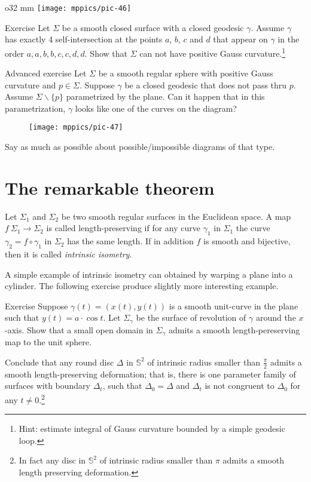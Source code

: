 {

\begin{wrapfigure}{o}{32 mm}
\vskip-0mm
\centering
\texttt{[image: mppics/pic-46]}
\vskip-0mm
\end{wrapfigure}

\begin{thm}{Exercise}
Let $\Sigma$ be a smooth closed surface with a closed geodesic $\gamma$.
Assume $\gamma$ has exactly 4 self-intersection at the points $a$, $b$, $c$ and $d$ that appear on $\gamma$ in the order $a,a,b,b,c,c,d,d$.
Show that $\Sigma$ can not have positive Gauss curvature.\footnote{Hint: estimate integral of Gauss curvature bounded by a simple geodesic loop.}
\end{thm}

\begin{thm}{Advanced exercise}
Let $\Sigma$ be a smooth regular sphere with positive Gauss curvature and $p\in\Sigma$. 
Suppose $\gamma$ be a closed geodesic that does not pass thru $p$.
Assume $\Sigma\backslash\{p\}$ parametrized by the plane.
Can it happen that in this parametrization,  $\gamma$ looks like one of the curves on the diagram?
\begin{figure}[h!]
\vskip-0mm
\centering
\texttt{[image: mppics/pic-47]}
\vskip-0mm
\end{figure}
Say as much as possible about possible/impossible diagrams of that type.
\end{thm}

}

\section{The remarkable theorem}

Let $\Sigma_1$ and $\Sigma_2$ be two smooth regular surfaces in the Euclidean space.
A map $f\:\Sigma_1\to \Sigma_2$ is called  length-preserving if for any curve $\gamma_1$ in $\Sigma_1$ the curve $\gamma_2=f\circ\gamma_1$ in $\Sigma_2$ has the same length. %
If in addition $f$ is smooth and bijective, then it is called \emph{intrinsic isometry}. 

A simple example of intrinsic isometry can obtained by warping a plane into a cylinder.
The following exercise produce slightly more interesting example.

\begin{thm}{Exercise}
Suppose $\gamma(t)=(x(t),y(t))$ is a smooth unit-curve in the plane such that $y(t)=a\cdot \cos t$.
Let $\Sigma_\gamma$ be the surface of revolution of $\gamma$ around the $x$-axis.
Show that a small open domain in $\Sigma_\gamma$ admits a smooth length-pereserving map to the unit sphere.

Conclude that any round disc $\Delta$ in $\mathbb{S}^2$ of intrinsic radius smaller than $\tfrac\pi2$ admits a smooth length-preserving deformation; that is, there is one parameter family of surfaces with boundary $\Delta_t$, such that $\Delta_0=\Delta$ and $\Delta_t$ is not congruent to $\Delta_0$ for any $t\ne0$.\footnote{In fact any disc in $\mathbb{S}^2$ of intrinsic radius smaller than $\pi$ admits a smooth length preserving deformation. %
}
\end{thm}


